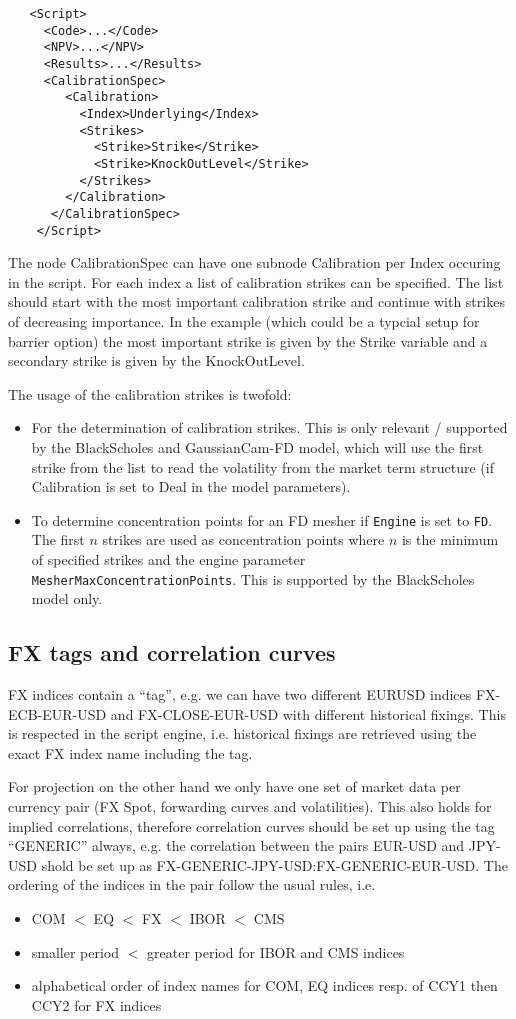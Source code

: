 \begin{verbatim}
   <Script>
     <Code>...</Code>
     <NPV>...</NPV>
     <Results>...</Results>
     <CalibrationSpec>
        <Calibration>
          <Index>Underlying</Index>
          <Strikes>
            <Strike>Strike</Strike>
            <Strike>KnockOutLevel</Strike>
          </Strikes>
        </Calibration>
      </CalibrationSpec>
    </Script>
\end{verbatim}

The node CalibrationSpec can have one subnode Calibration per Index occuring in the script. For each index a list of
calibration strikes can be specified. The list should start with the most important calibration strike and continue with
strikes of decreasing importance. In the example (which could be a typcial setup for barrier option) the most important
strike is given by the Strike variable and a secondary strike is given by the KnockOutLevel.

The usage of the calibration strikes is twofold:

\begin{itemize}
\item For the determination of calibration strikes. This is only relevant / supported by the BlackScholes and
  GaussianCam-FD model, which will use the first strike from the list to read the volatility from the market term
  structure (if Calibration is set to Deal in the model parameters).
\item To determine concentration points for an FD mesher if \verb+Engine+ is set to \verb+FD+. The first $n$ strikes are
  used as concentration points where $n$ is the minimum of specified strikes and the engine parameter
  \verb+MesherMaxConcentrationPoints+. This is supported by the BlackScholes model only.
\end{itemize}

\subsection{FX tags and correlation curves}\label{fxtags_correlationcurves}

FX indices contain a ``tag'', e.g. we can have two different EURUSD indices FX-ECB-EUR-USD and FX-CLOSE-EUR-USD with
different historical fixings. This is respected in the script engine, i.e. historical fixings are retrieved using the
exact FX index name including the tag.

For projection on the other hand we only have one set of market data per currency pair (FX Spot, forwarding curves and
volatilities). This also holds for implied correlations, therefore correlation curves should be set up using the tag
``GENERIC'' always, e.g. the correlation between the pairs EUR-USD and JPY-USD shold be set up as
FX-GENERIC-JPY-USD:FX-GENERIC-EUR-USD. The ordering of the indices in the pair follow the usual rules, i.e.

\begin{itemize}
\item COM $<$ EQ $<$ FX $<$ IBOR $<$ CMS
\item smaller period $<$ greater period for IBOR and CMS indices
\item alphabetical order of index names for COM, EQ indices resp. of CCY1 then CCY2 for FX indices
\end{itemize}
